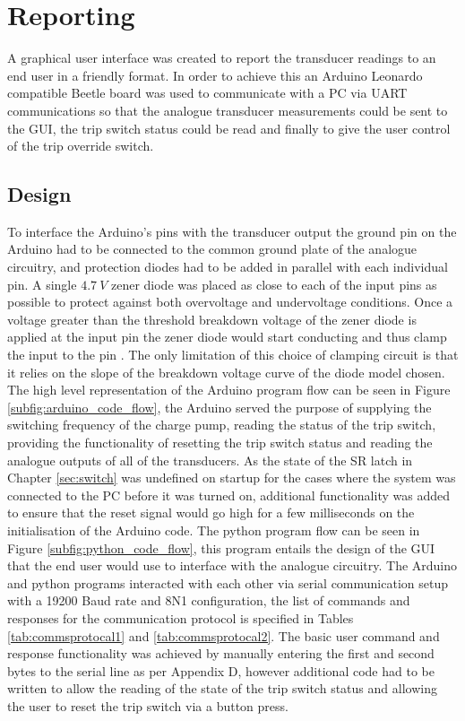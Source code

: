 \chapter{Reporting} \label{ch:reporting}
A graphical user interface was created to report the transducer readings to an end user in a friendly format. In order to achieve this an Arduino Leonardo compatible Beetle board was used to communicate with a PC via UART communications so that the analogue transducer measurements could be sent to the GUI, the trip switch status could be read and finally to give the user control of the trip override switch.

\section{Design} \label{sec:rep_design}
To interface the Arduino's pins with the transducer output the ground pin on the Arduino had to be connected to the common ground plate of the analogue circuitry, and protection diodes had to be added in parallel with each individual pin. A single $\SI{4.7}{V}$ zener diode was placed as close to each of the input pins as possible to protect against both overvoltage and undervoltage conditions. Once a voltage greater than the threshold breakdown voltage of the zener diode is applied at the input pin the zener diode would start conducting and thus clamp the input to the pin \cite{zenerboi}. The only limitation of this choice of clamping circuit is that it relies on the slope of the breakdown voltage curve of the diode model chosen.\vspace{4mm} \newline The high level representation of the Arduino program flow can be seen in Figure \ref{subfig:arduino_code_flow}, the Arduino served the purpose of supplying the switching frequency of the charge pump, reading the status of the trip switch, providing the functionality of resetting the trip switch status and reading the analogue outputs of all of the transducers. As the state of the SR latch in Chapter \ref{sec:switch} was undefined on startup for the cases where the system was connected to the PC before it was turned on, additional functionality was added to ensure that the reset signal would go high for a few milliseconds on the initialisation of the Arduino code. The python program flow can be seen in Figure \ref{subfig:python_code_flow}, this program entails the design of the GUI that the end user would use to interface with the analogue circuitry. \vspace{4mm} \newline The Arduino and python programs interacted with each other via serial communication setup with a 19200 Baud rate and 8N1 configuration, the list of commands and responses for the communication protocol is specified in Tables \ref{tab:commsprotocal1} and \ref{tab:commsprotocal2}. The basic user command and response functionality was achieved by manually entering the first and second bytes to the serial line as per Appendix D, however additional code had to be written to allow the reading of the state of the trip switch status and allowing the user to reset the trip switch via a button press. 

